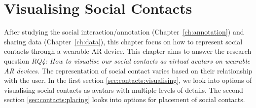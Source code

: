 \chapter{Visualising Social Contacts}
\label{ch:contacts} 

After studying the social interaction/annotation (Chapter~\ref{ch:annotation}) and sharing data (Chapter~\ref{ch:data}), this chapter focus on how to represent social contacts through a wearable AR device. 
This chapter aims to answer the research question \textit{RQ4: How to visualise our social contacts as virtual avatars on wearable AR devices}.
The representation of social contact varies based on their relationship with the user. 
In the first section \ref{sec:contacts:visualising}, we look into options of visualising social contacts as avatars with multiple levels of details. The second section \ref{sec:contacts:placing} looks into options for placement of social contacts. 




